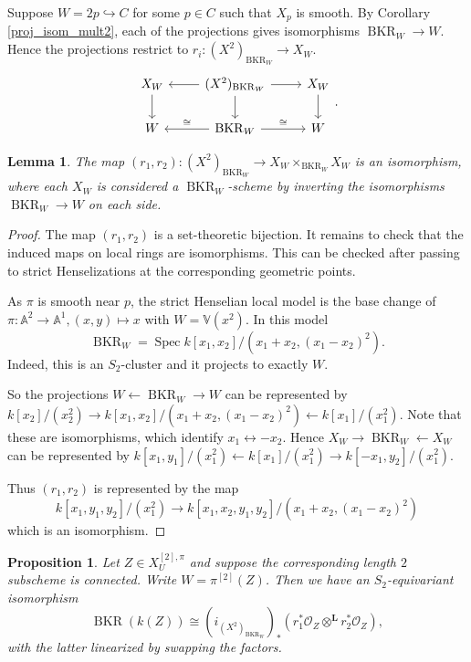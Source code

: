 \documentclass{amsart}
\theoremstyle{plain}
\newtheorem{lemma}[theorem]{Lemma}
\newtheorem{proposition}[theorem]{Proposition}
\theoremstyle{definition}
\theoremstyle{remark}
\begin{document}
    Suppose $W=2p\hookrightarrow C$ for some $p\in C$ such that $X_p$ is smooth.
    By Corollary \ref{proj_isom_mult2}, each of the projections gives isomorphisms $\operatorname{BKR}_W\to W$.
    Hence the projections restrict to $r_i:(X^2)_{\operatorname{BKR}_W}\to X_W$.
    \[\begin{tikzcd}
        X_W\dar&(X^2)_{\operatorname{BKR}_W}\dar\rar\lar&X_W\dar\\
        W&\operatorname{BKR}_W\rar{\cong}\lar[swap]{\cong}&W
    \end{tikzcd}.\]
    \begin{lemma}
        The map $(r_1,r_2):(X^2)_{\operatorname{BKR}_W}\to X_W\times_{\operatorname{BKR}_W}X_W$ is an isomorphism, where each $X_W$ is considered a $\operatorname{BKR}_W$-scheme by inverting the isomorphisms $\operatorname{BKR}_W\to W$ on each side.
    \end{lemma}
    \begin{proof}
        The map $(r_1,r_2)$ is a set-theoretic bijection.
        It remains to check that the induced maps on local rings are isomorphisms.
        This can be checked after passing to strict Henselizations at the corresponding geometric points.

        As $\pi$ is smooth near $p$, the strict Henselian local model is the base change of $\pi:\mathbb A^2\to\mathbb A^1,(x,y)\mapsto x$ with $W=\mathbb V(x^2)$.
        In this model
        \[
        \operatorname{BKR}_W=\operatorname{Spec} k[x_1,x_2]/(x_1+x_2,(x_1-x_2)^2).
        \]
        Indeed, this is an $S_2$-cluster and it projects to exactly $W$.

        So the projections $W\leftarrow\operatorname{BKR}_W\rightarrow W$ can be represented by $k[x_2]/(x_2^2)\rightarrow k[x_1,x_2]/(x_1+x_2,(x_1-x_2)^2)\leftarrow k[x_1]/(x_1^2)$.
        Note that these are isomorphisms, which identify $x_1\leftrightarrow -x_2$.
        Hence $X_W\rightarrow\operatorname{BKR}_W\leftarrow X_W$ can be represented by $k[x_1,y_1]/(x_1^2)\leftarrow k[x_1]/(x_1^2)\rightarrow k[-x_1,y_2]/(x_1^2)$.

        Thus $(r_1,r_2)$ is represented by the map \[k[x_1,y_1,y_2]/(x_1^2)\to k[x_1,x_2,y_1,y_2]/(x_1+x_2,(x_1-x_2)^2)\] which is an isomorphism.
    \end{proof}
    \begin{proposition}
        Let $Z\in X^{[2],\pi}_U$ and suppose the corresponding length $2$ subscheme is connected.
        Write $W=\pi^{[2]}(Z)$.
        Then we have an $S_2$-equivariant isomorphism
        \[\operatorname{BKR}(k(Z))\cong (i_{(X^2)_{\operatorname{BKR}_W}})_\ast(r_1^\ast\mathcal O_Z\otimes^{\mathbf L}r_2^\ast\mathcal O_Z),\]
        with the latter linearized by swapping the factors.
    \end{proposition}
\end{document}
